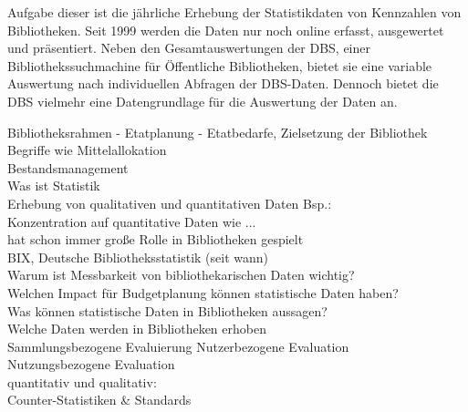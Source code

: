 Aufgabe dieser ist die jährliche Erhebung der Statistikdaten von Kennzahlen von Bibliotheken.  Seit 1999 werden die Daten nur noch online erfasst, ausgewertet und präsentiert. 
Neben den Gesamtauswertungen der DBS, einer Bibliothekssuchmachine für Öffentliche Bibliotheken, bietet sie eine variable Auswertung nach individuellen Abfragen der DBS-Daten. Dennoch bietet die DBS vielmehr eine Datengrundlage für die Auswertung der Daten an.


\clearpage
Bibliotheksrahmen - Etatplanung - Etatbedarfe, Zielsetzung der Bibliothek\\
Begriffe wie Mittelallokation\\
Bestandsmanagement\\
Was ist Statistik\\
Erhebung von qualitativen und quantitativen Daten Bsp.:\\
Konzentration auf quantitative Daten wie ...\\
hat schon immer große Rolle in Bibliotheken gespielt\\
BIX, Deutsche Bibliotheksstatistik (seit wann)\\
Warum ist Messbarkeit von bibliothekarischen Daten wichtig?\\
Welchen Impact für Budgetplanung können statistische Daten haben?\\
Was können statistische Daten in Bibliotheken aussagen?\\
Welche Daten werden in Bibliotheken erhoben\\
Sammlungsbezogene Evaluierung
Nutzerbezogene Evaluation\\
Nutzungsbezogene Evaluation\\
quantitativ und qualitativ:\\
Counter-Statistiken \& Standards\\

\clearpage

